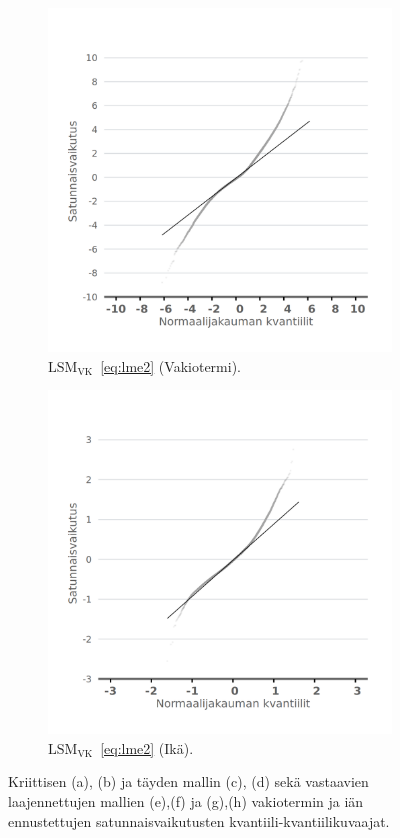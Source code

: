 \documentclass[finnish]{docopts}
\begin{document}
\begin{figure}[H]
\begin{subfigure}[b]{0.4\textwidth}
  \label{fig:lme_vk_krit_ika_qq}
\end{subfigure}
\begin{subfigure}[b]{0.4\textwidth}
\centering
  \includegraphics[width=.8\linewidth]{kuvaajat/lme3_full_vc_qq_ranef_int.png}
  \caption{$\text{LSM}_{\text{VK}}$~\ref{eq:lme2} (Vakiotermi).}
  \label{fig:lme_vk_taysi_int_qq}
\end{subfigure}%
\begin{subfigure}[b]{0.4\textwidth}
\centering
  \includegraphics[width=.8\linewidth]{kuvaajat/lme3_full_vc_qq_ranef_ika.png}
  \caption{$\text{LSM}_{\text{VK}}$~\ref{eq:lme2} (Ikä).}
  \label{fig:lme_vk_taysi_ika_qq}
\end{subfigure}
 \caption{Kriittisen (a), (b) ja täyden mallin (c), (d) sekä vastaavien laajennettujen mallien (e),(f) ja (g),(h) vakiotermin ja iän ennustettujen satunnaisvaikutusten kvantiili-kvantiilikuvaajat.}
   \label{fig:lme_ranef_qq}
\end{figure}
\end{document}
